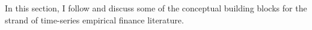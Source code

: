 In this section, I follow \citet[Chapter~5]{campbell2017financial} and discuss some 
of the conceptual building blocks for the strand of time-series empirical finance literature.

